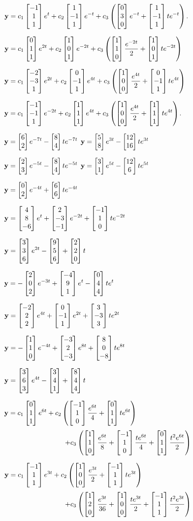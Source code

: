 \smallskip
{}
 $\vect{y}=\dst{c_1\threecol{-1}11e^t+c_2\threecol1{-1}1e^{-t}+c_3\left
(\threecol030e^{-t}+\threecol1{-1}1te^{-t}\right)}$.

\smallskip
{}
$\vect{y}=\dst{c_1\threecol011e^{2t}+c_2\threecol101e^{-2t}+c_3\left
(\threecol110\frac{e^{-2t}}{2}+\threecol101te^{-2t}\right)}$

\smallskip
{}
 $\vect{y}=\dst{
c_1\threecol{-2}{-3}1e^{2t}+c_2\threecol0{-1}1e^{4t}+c_3\left
(\threecol100\frac{e^{4t}}{2}+\threecol0{-1}1te^{4t}\right)}$

\smallskip
{}
 $\vect{y}=\dst{
c_1\threecol{-1}{-1}1e^{-2t}+c_2\threecol111e^{4t}+c_3\left
(\threecol100\frac{e^{4t}}{2}+\threecol111te^{4t}\right)}$.

\smallskip
{}
$\vect{y}=\dst{\twocol62e^{-7t}-\twocol84te^{-7t}}$
$\vect{y}=\dst{\twocol58e^{3t}-\twocol{12}{16}te^{3t}}$

\smallskip
{}
$\vect{y}=\dst{\twocol23e^{-5t}-\twocol84te^{-5t}}$
$\vect{y}=\dst{\twocol31e^{5t}-\twocol{12}6te^{5t}}$

$\vect{y}=\dst{\twocol02e^{-4t}+\twocol66te^{-4t}}$

\smallskip
{}
$\vect{y}=\dst{\threecol48{-6}e^t+\threecol2{-3}{-1}e^{-2t}+
\threecol{-1}10te^{-2t}}$

\smallskip
{}
$\vect{y}=\dst{\threecol336e^{2t}-\threecol956+\threecol220t}$

\smallskip
{}
$\vect{y}=\dst{-\threecol202e^{-3t}+\threecol{-4}91e^t-
\threecol044te^t}$

\smallskip
{}
$\vect{y}=\dst{\threecol{-2}22e^{4t}+\threecol0{-1}1e^{2t}+
\threecol3{-3}3te^{2t}}$

\smallskip
{}
$\vect{y}=\dst{-\threecol110e^{-4t}+\threecol{-3}2{-3}e^{8t}+
\threecol80{-8}te^{8t}}$

\smallskip
{}
$\vect{y}=\dst{\threecol363e^{4t}-\threecol341+\threecol844t}$

$\vect{y}=\dst{c_1\threecol011e^{6t}+
c_2\left(\threecol{-1}10\frac{e^{6t}}{4}+\threecol011te^{6t}\right)}$
\[+c_3\left(\threecol110\frac{e^{6t}}{8}+\threecol{-1}10\frac{t
e^{6t}}{4}+\threecol011\frac{t^2e^{6t}}{2}\right)\]

\smallskip
{}
 $\vect{y}=\dst{c_1\threecol{-1}11e^{3t}+
c_2\left(\threecol100\frac{e^{3t}}{2}+\threecol{-1}11te^{3t}\right)}$
\[+c_3\left(\threecol120\frac{e^{3t}}{36}+\threecol100
\frac{te^{3t}}{2}+\threecol{-1}11\frac{t^2e^{3t}}{2}\right)\]

